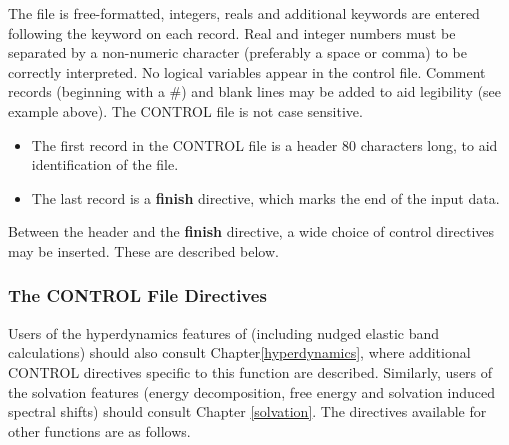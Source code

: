 The file is free-formatted, integers, reals and additional keywords
are entered following the keyword on each record. Real and integer
numbers must be separated by a non-numeric character (preferably a
space or comma) to be correctly interpreted. No logical variables
appear in the control file. Comment records (beginning with a \#) and
blank lines may be added to aid legibility (see example above).  The
CONTROL file is not case sensitive.

\begin{itemize}
\item The first record in the CONTROL file is a header 80 characters
long,
to aid identification of the file.
\item The last record is a {\bf finish} directive, which marks the end
of the input data.
\end{itemize}

Between the header and the {\bf finish} directive, a wide choice of
control
directives may be inserted. These are described below.

\subsubsection{The CONTROL File Directives}

Users of the hyperdynamics features of \D{} (including nudged elastic band
calculations) should also consult Chapter\ref{hyperdynamics}, where
additional CONTROL directives specific to this function are described.
Similarly, users of the solvation features (energy decomposition, free energy
and solvation induced spectral shifts) should consult Chapter \ref{solvation}.
The directives available for other functions are as follows.

